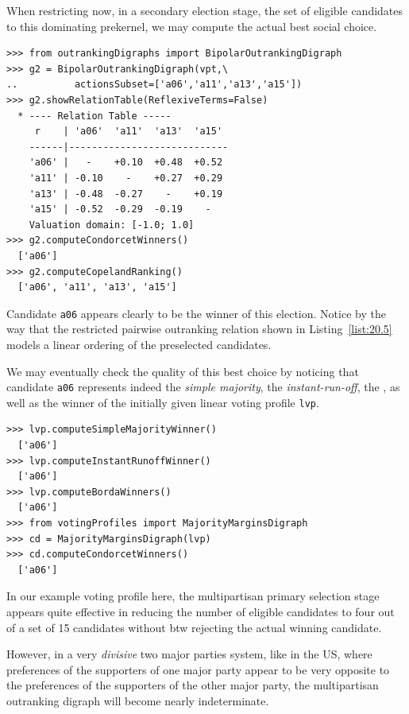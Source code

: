 
When restricting now, in a secondary election stage, the set of eligible candidates to this dominating prekernel, we may compute the actual best social choice.
\begin{lstlisting}[caption={Recommending the secondary election winner},label=list:20.5]
>>> from outrankingDigraphs import BipolarOutrankingDigraph
>>> g2 = BipolarOutrankingDigraph(vpt,\
..          actionsSubset=['a06','a11','a13','a15'])
>>> g2.showRelationTable(ReflexiveTerms=False)
  * ---- Relation Table -----
     r    | 'a06'  'a11'  'a13'  'a15'   
    ------|----------------------------
    'a06' |   -    +0.10  +0.48  +0.52  
    'a11' | -0.10    -    +0.27  +0.29  
    'a13' | -0.48  -0.27    -    +0.19  
    'a15' | -0.52  -0.29  -0.19    -   
    Valuation domain: [-1.0; 1.0]
>>> g2.computeCondorcetWinners()
  ['a06']
>>> g2.computeCopelandRanking()
  ['a06', 'a11', 'a13', 'a15']
\end{lstlisting}
Candidate \texttt{a06} appears clearly to be the winner of this election. Notice by the way that the restricted pairwise outranking relation shown in Listing~\vref{list:20.5} models a linear ordering of the preselected candidates.

We may eventually check the quality of this best choice by noticing that candidate \texttt{a06} represents indeed the \emph{simple majority}, the \emph{instant-run-off}, the \Borda, as well as the \Condorcet winner of the initially given linear voting profile \texttt{lvp}.
\begin{lstlisting}
>>> lvp.computeSimpleMajorityWinner()
  ['a06']
>>> lvp.computeInstantRunoffWinner()
  ['a06']
>>> lvp.computeBordaWinners()
  ['a06']
>>> from votingProfiles import MajorityMarginsDigraph
>>> cd = MajorityMarginsDigraph(lvp)
>>> cd.computeCondorcetWinners()
  ['a06']
\end{lstlisting}

In our example voting profile here, the multipartisan primary selection stage appears quite effective in reducing the number of eligible candidates to four out of a set of 15 candidates without btw rejecting the actual winning candidate.

However, in a very \emph{divisive} two major parties system, like in the US, where preferences of the supporters of one major party appear to be very opposite to the preferences of the supporters of the other major party, the multipartisan outranking digraph will become nearly indeterminate.


